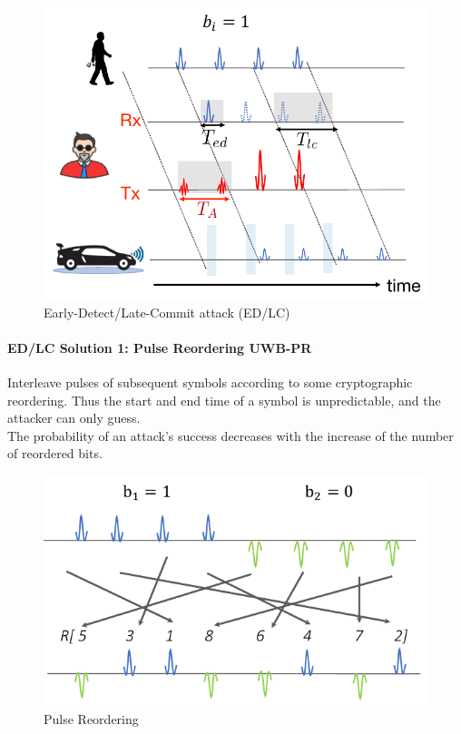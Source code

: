 \begin{figure}[h]
	\centering
	\includegraphics[scale=0.3]{images/5-edlc.png}
	\caption{Early-Detect/Late-Commit attack (ED/LC)}%
	\label{fig:edlc}
\end{figure}

\paragraph{ED/LC Solution 1: Pulse Reordering UWB-PR}
Interleave pulses of subsequent symbols according to some cryptographic reordering.
Thus the start and end time of a symbol is unpredictable, and the attacker can only guess.
\\
The probability of an attack's success decreases with the increase of the number of reordered bits.

\begin{figure}[h]
	\centering
	\includegraphics[scale=0.45]{images/5-pulse-reordering.png}
	\caption{Pulse Reordering}%
	\label{fig:pulse-reordering}
\end{figure}

